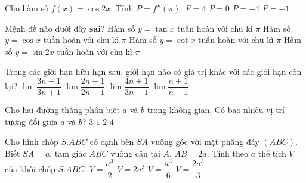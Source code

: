 \begin{ex}%
Cho hàm số $f(x)=\cos2x$. Tính $P=f''(\pi)$.
\choice
{$P=4$}
{$P=0$}
{\True$P=-4$}
{$P=-1$}
\end{ex}
\begin{ex}%
Mệnh đề nào dưới đây \textbf{sai}?
\choice
{Hàm số $y=\tan x$ tuần hoàn với chu kì $\pi$}
{\True Hàm số $y=\cos x$ tuần hoàn với chu kì $\pi$}
{Hàm số $y=\cot x$ tuần hoàn với chu kì $\pi$}
{Hàm số $y=\sin2x$ tuần hoàn với chu kì $\pi$}
\end{ex}
\begin{ex}%
Trong các giới hạn hữu hạn sau, giới hạn nào có giá trị khác với các giới hạn còn lại?
\choice
{$\lim\dfrac{3n-1}{3n+1}$}
{$\lim\dfrac{2n+1}{2n-1}$}
{\True$\lim\dfrac{4n+1}{3n-1}$}
{$\lim\dfrac{n+1}{n-1}$}
\end{ex}
\begin{ex}%
Cho hai đường thẳng phân biệt $a$ và $b$ trong không gian. Có bao nhiêu vị trí tương đối giữa $a$ và $b$?
\choice
{\True$3$}
{$1$}
{$2$}
{$4$}
\end{ex}
\begin{ex}%
Cho hình chóp $S.ABC$ có cạnh bên $SA$ vuông góc với mặt phẳng đáy $(ABC)$. Biết $SA=a$, tam giác $ABC$ vuông cân tại $A$, $AB=2a$. Tính theo $a$ thể tích $V$ của khối chóp $S.ABC$.
\choice
{$V=\dfrac{a^3}{2}$}
{$V=2a^3$}
{$V=\dfrac{a^3}{6}$}
{\True$V=\dfrac{2a^3}{3}$}
\end{ex}
